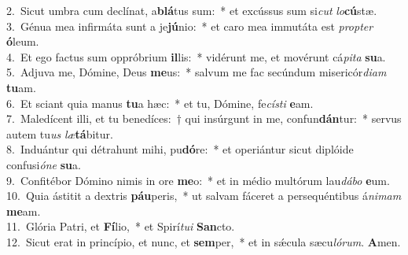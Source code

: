 {2.~}Sicut umbra cum declínat, a\textbf{blá}tus sum:~* et excússus sum si\textit{cut} \textit{lo}\textbf{cú}stæ.\\
{3.~}Génua mea infirmáta sunt a je\textbf{jú}nio:~* et caro mea immutáta est \textit{prop}\textit{ter} \textbf{ó}leum.\\
{4.~}Et ego factus sum oppróbrium \textbf{il}lis:~* vidérunt me, et movérunt cá\textit{pi}\textit{ta} \textbf{su}a.\\
{5.~}Adjuva me, Dómine, Deus \textbf{me}us:~* salvum me fac secúndum misericór\textit{di}\textit{am} \textbf{tu}am.\\
{6.~}Et sciant quia manus \textbf{tu}a hæc:~* et tu, Dómine, fe\textit{cí}\textit{sti} \textbf{e}am.\\
{7.~}Maledícent illi, et tu benedíces:~† qui insúrgunt in me, confun\textbf{dán}tur:~* servus autem tu\textit{us} \textit{læ}\textbf{tá}bitur.\\
{8.~}Induántur qui détrahunt mihi, pu\textbf{dó}re:~* et operiántur sicut diplóide confusi\textit{ó}\textit{ne} \textbf{su}a.\\
{9.~}Confitébor Dómino nimis in ore \textbf{me}o:~* et in médio multórum lau\textit{dá}\textit{bo} \textbf{e}um.\\
{10.~}Quia ástitit a dextris \textbf{páu}peris,~* ut salvam fáceret a persequéntibus á\textit{ni}\textit{mam} \textbf{me}am.\\
{11.~}Glória Patri, et \textbf{Fí}lio,~* et Spirí\textit{tu}\textit{i} \textbf{San}cto.\\
{12.~}Sicut erat in princípio, et nunc, et \textbf{sem}per,~* et in sǽcula sæcu\textit{ló}\textit{rum}. \textbf{A}men.\\
